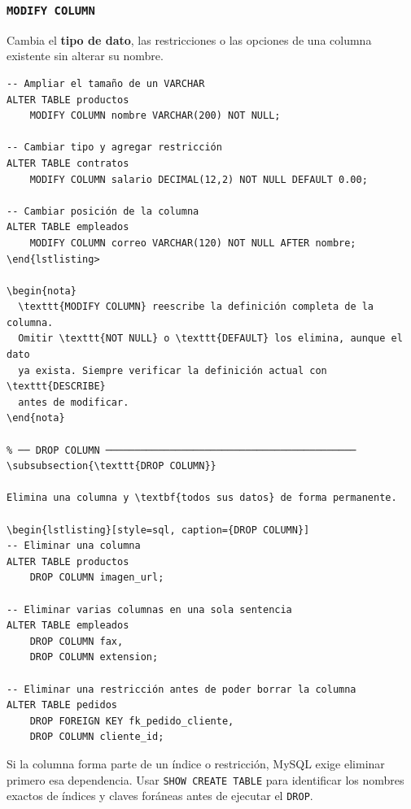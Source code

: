 \subsubsection{\texttt{MODIFY COLUMN}}

Cambia el \textbf{tipo de dato}, las restricciones o las opciones de una
columna existente sin alterar su nombre.

\begin{lstlisting}[style=sql, caption={MODIFY COLUMN — cambios de tipo y propiedades}]
-- Ampliar el tamaño de un VARCHAR
ALTER TABLE productos
    MODIFY COLUMN nombre VARCHAR(200) NOT NULL;

-- Cambiar tipo y agregar restricción
ALTER TABLE contratos
    MODIFY COLUMN salario DECIMAL(12,2) NOT NULL DEFAULT 0.00;

-- Cambiar posición de la columna
ALTER TABLE empleados
    MODIFY COLUMN correo VARCHAR(120) NOT NULL AFTER nombre;
\end{lstlisting>

\begin{nota}
  \texttt{MODIFY COLUMN} reescribe la definición completa de la columna.
  Omitir \texttt{NOT NULL} o \texttt{DEFAULT} los elimina, aunque el dato
  ya exista. Siempre verificar la definición actual con \texttt{DESCRIBE}
  antes de modificar.
\end{nota}

% ── DROP COLUMN ───────────────────────────────────────────
\subsubsection{\texttt{DROP COLUMN}}

Elimina una columna y \textbf{todos sus datos} de forma permanente.

\begin{lstlisting}[style=sql, caption={DROP COLUMN}]
-- Eliminar una columna
ALTER TABLE productos
    DROP COLUMN imagen_url;

-- Eliminar varias columnas en una sola sentencia
ALTER TABLE empleados
    DROP COLUMN fax,
    DROP COLUMN extension;

-- Eliminar una restricción antes de poder borrar la columna
ALTER TABLE pedidos
    DROP FOREIGN KEY fk_pedido_cliente,
    DROP COLUMN cliente_id;
\end{lstlisting}

\begin{nota}
  Si la columna forma parte de un índice o restricción, MySQL exige
  eliminar primero esa dependencia. Usar \texttt{SHOW CREATE TABLE}
  para identificar los nombres exactos de índices y claves foráneas
  antes de ejecutar el \texttt{DROP}.
\end{nota}

